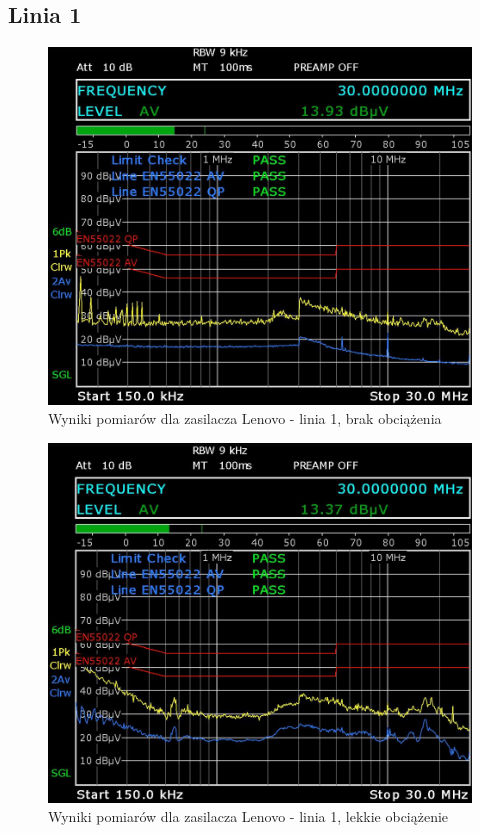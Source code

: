 \documentclass[12pt, a4paper, oneside]{article}
\begin{document}
\subsection{Linia 1}
\begin{figure}[h!]
\centering
\caption{Wyniki pomiarów dla zasilacza Lenovo - linia 1, brak obciążenia}
\includegraphics[scale=0.34]{Linia1/k1.png}
\end{figure}\bigskip
\begin{figure}[h!]
\centering
\caption{Wyniki pomiarów dla zasilacza Lenovo - linia 1, lekkie obciążenie}
\includegraphics[scale=0.34]{Linia1/k2.png}
\end{figure}
\end{document}

